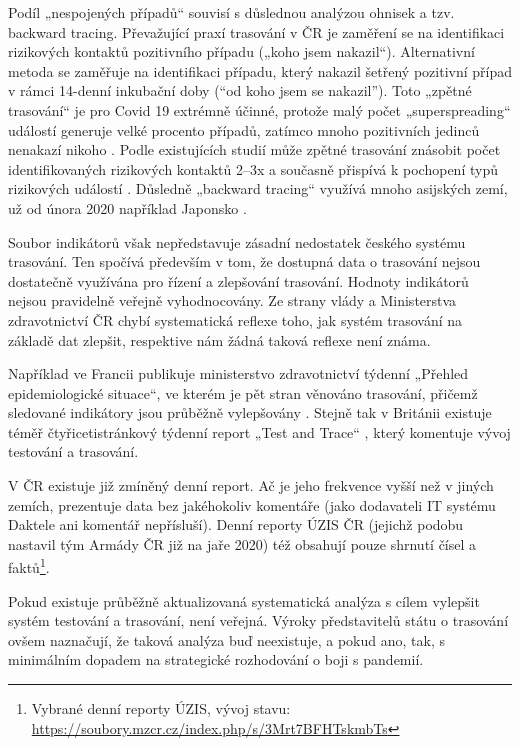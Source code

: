 Podíl „nespojených případů“ souvisí s důslednou analýzou ohnisek a tzv. backward tracing. Převažující praxí trasování v ČR je zaměření se na identifikaci rizikových kontaktů pozitivního případu („koho jsem nakazil“). Alternativní metoda se zaměřuje na identifikaci případu, který nakazil šetřený pozitivní případ v rámci 14-denní inkubační doby (“od koho jsem se nakazil”). Toto „zpětné trasování“ je pro Covid 19 extrémně účinné, protože malý počet „superspreading“ událostí generuje velké procento případů, zatímco mnoho pozitivních jedinců nenakazí nikoho \cite{tr_adam_clustering_2020}. Podle existujících studií může zpětné trasování znásobit počet identifikovaných rizikových kontaktů 2--3x a současně přispívá k pochopení typů rizikových událostí \cite{tr_Endo}. Důsledně „backward tracing“ využívá mnoho asijských zemí, už od února 2020 například Japonsko \cite{tr_Loh}.

Soubor indikátorů však nepředstavuje zásadní nedostatek českého systému trasování. Ten spočívá především v tom, že dostupná data o trasování nejsou dostatečně využívána pro řízení a zlepšování trasování. Hodnoty indikátorů nejsou pravidelně veřejně vyhodnocovány. Ze strany vlády a Ministerstva zdravotnictví ČR chybí systematická reflexe toho, jak systém trasování na základě dat zlepšit, respektive nám žádná taková reflexe není známa.

Například ve Francii publikuje ministerstvo zdravotnictví týdenní „Přehled epidemiologické situace“, ve kterém je pět stran věnováno trasování, přičemž sledované indikátory jsou průběžně vylepšovány \cite{tr_france}. Stejně tak v Británii existuje téměř čtyřicetistránkový týdenní report „Test and Trace“ \cite{tr_gov_uk}, který komentuje vývoj testování a trasování.

V ČR existuje již zmíněný denní report. Ač je jeho frekvence vyšší než v jiných zemích, prezentuje data bez jakéhokoliv komentáře (jako dodavateli IT systému Daktele ani komentář nepřísluší). Denní reporty ÚZIS ČR (jejichž podobu nastavil tým Armády ČR již na jaře 2020) též obsahují pouze shrnutí čísel a faktů\footnote{Vybrané denní reporty ÚZIS, vývoj stavu: \url{https://soubory.mzcr.cz/index.php/s/3Mrt7BFHTskmbTs}}.

Pokud existuje průběžně aktualizovaná systematická analýza s cílem vylepšit systém testování a trasování, není veřejná. Výroky představitelů státu o trasování ovšem naznačují, že taková analýza buď neexistuje, a pokud ano, tak, s minimálním dopadem na strategické rozhodování o boji s pandemií.


